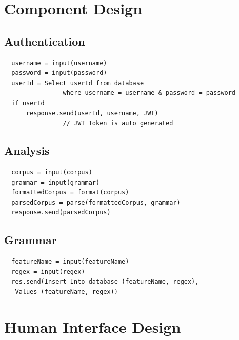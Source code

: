 \section{Component Design}

\subsection{Authentication}
\begin{verbatim}
  username = input(username)
  password = input(password)
  userId = Select userId from database 
                where username = username & password = password
  if userId
      response.send(userId, username, JWT) 
                // JWT Token is auto generated  
\end{verbatim}

\subsection{Analysis}
\begin{verbatim}
  corpus = input(corpus)
  grammar = input(grammar)
  formattedCorpus = format(corpus)
  parsedCorpus = parse(formattedCorpus, grammar)
  response.send(parsedCorpus)
\end{verbatim}

\subsection{Grammar}
\begin{verbatim}
  featureName = input(featureName)
  regex = input(regex)
  res.send(Insert Into database (featureName, regex),
   Values (featureName, regex))
\end{verbatim}

\section{Human Interface Design}

